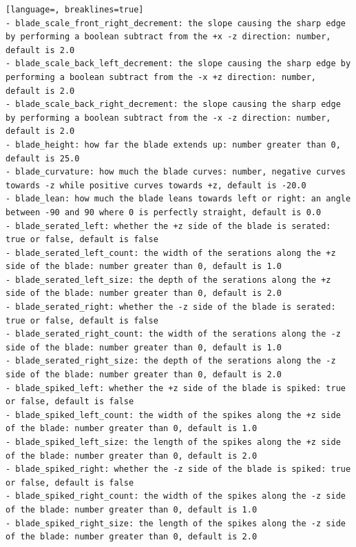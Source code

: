 \documentclass[12pt,a4paper]{article}
\begin{document}
\begin{lstlisting}[language=, breaklines=true]
- blade_scale_front_right_decrement: the slope causing the sharp edge by performing a boolean subtract from the +x -z direction: number, default is 2.0
- blade_scale_back_left_decrement: the slope causing the sharp edge by performing a boolean subtract from the -x +z direction: number, default is 2.0
- blade_scale_back_right_decrement: the slope causing the sharp edge by performing a boolean subtract from the -x -z direction: number, default is 2.0
- blade_height: how far the blade extends up: number greater than 0, default is 25.0
- blade_curvature: how much the blade curves: number, negative curves towards -z while positive curves towards +z, default is -20.0
- blade_lean: how much the blade leans towards left or right: an angle between -90 and 90 where 0 is perfectly straight, default is 0.0
- blade_serated_left: whether the +z side of the blade is serated: true or false, default is false
- blade_serated_left_count: the width of the serations along the +z side of the blade: number greater than 0, default is 1.0
- blade_serated_left_size: the depth of the serations along the +z side of the blade: number greater than 0, default is 2.0
- blade_serated_right: whether the -z side of the blade is serated: true or false, default is false
- blade_serated_right_count: the width of the serations along the -z side of the blade: number greater than 0, default is 1.0
- blade_serated_right_size: the depth of the serations along the -z side of the blade: number greater than 0, default is 2.0
- blade_spiked_left: whether the +z side of the blade is spiked: true or false, default is false
- blade_spiked_left_count: the width of the spikes along the +z side of the blade: number greater than 0, default is 1.0
- blade_spiked_left_size: the length of the spikes along the +z side of the blade: number greater than 0, default is 2.0
- blade_spiked_right: whether the -z side of the blade is spiked: true or false, default is false
- blade_spiked_right_count: the width of the spikes along the -z side of the blade: number greater than 0, default is 1.0
- blade_spiked_right_size: the length of the spikes along the -z side of the blade: number greater than 0, default is 2.0



\end{lstlisting}
\end{document}

